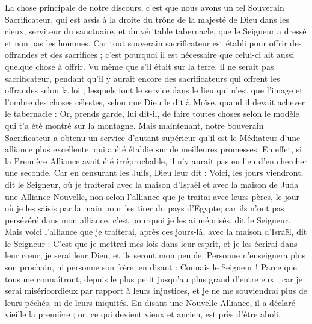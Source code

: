 \begin{multicols}{2}
\VerseOne{}La chose principale de notre discours, c'est que nous avons un tel Souverain Sacrificateur, qui est assis à la droite du trône de la majesté de Dieu dans les cieux,
serviteur du sanctuaire, et du véritable tabernacle, que le Seigneur a dressé et non pas les hommes.
Car tout souverain sacrificateur est établi pour offrir des offrandes et des sacrifices ; c'est pourquoi il est nécessaire que celui-ci ait aussi quelque chose à offrir.
Vu même que s'il était sur la terre, il ne serait pas sacrificateur, pendant qu'il y aurait encore des sacrificateurs qui offrent les offrandes selon la loi ;
lesquels font le service dans le lieu qui n'est que l'image et l'ombre des choses célestes, selon que Dieu le dit à Moïse, quand il devait achever le tabernacle : Or, prends garde, lui dit-il, de faire toutes choses selon le modèle qui t'a été montré sur la montagne.
Mais maintenant, notre Souverain Sacrificateur a obtenu un service d'autant supérieur qu'il est le Médiateur d'une alliance plus excellente, qui a été établie sur de meilleures promesses.
En effet, si la Première Alliance avait été irréprochable, il n'y aurait pas eu lieu d'en chercher une seconde.
Car en censurant les Juifs, Dieu leur dit : Voici, les jours viendront, dit le Seigneur, où je traiterai avec la maison d'Israël et avec la maison de Juda une Alliance Nouvelle,
non selon l'alliance que je traitai avec leurs pères, le jour où je les saisis par la main pour les tirer du pays d'Egypte; car ils n'ont pas persévéré dans mon alliance, c'est pourquoi je les ai méprisés, dit le Seigneur.
Mais voici l'alliance que je traiterai, après ces jours-là, avec la maison d'Israël, dit le Seigneur : C'est que je mettrai mes lois dans leur esprit, et je les écrirai dans leur cœur, je serai leur Dieu, et ils seront mon peuple.
Personne n'enseignera plus son prochain, ni personne son frère, en disant : Connais le Seigneur ! Parce que tous me connaîtront, depuis le plus petit jusqu'au plus grand d'entre eux ;
car je serai miséricordieux par rapport à leurs injustices, et je ne me souviendrai plus de leurs péchés, ni de leurs iniquités.
En disant une Nouvelle Alliance, il a déclaré vieille la première ; or, ce qui devient vieux et ancien, est près d'être aboli.

\end{multicols}
